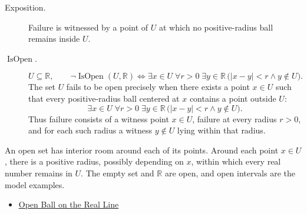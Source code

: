 \begin{remark*}
\begin{description}
  \item[Exposition.]
  Failure is witnessed by a point of $U$ at which no positive-radius ball
  remains inside $U$.

  \item[\(\operatorname{IsOpen}.\)]
  \[
  U\subseteq\mathbb{R},\qquad
  \neg\operatorname{IsOpen}(U,\mathbb{R})
  \Longleftrightarrow
  \exists x\in U\;\forall r>0\;\exists y\in\mathbb{R}\,
  \bigl(|x-y|<r\land y\notin U\bigr).
  \]
  The set $U$ fails to be open precisely when there exists a point $x\in U$
  such that every positive-radius ball centered at $x$ contains a point outside
  $U$:
\[
\exists x\in U\;\forall r>0\;\exists y\in\mathbb{R}\,
\bigl(|x-y|<r\land y\notin U\bigr).
\]
  Thus failure consists of a witness point $x\in U$, failure at every radius
  $r>0$, and for each such radius a witness $y\notin U$ lying within that
  radius.
\end{description}
\end{remark*}
\begin{remark*}[Interpretation]
An open set has interior room around each of its points. Around each point
$x\in U$, there is a positive radius, possibly depending on $x$, within which
every real number remains in $U$. The empty set and $\mathbb{R}$ are open, and
open intervals are the model examples.
\end{remark*}
\begin{dependencies}
\begin{itemize}
  \item \hyperref[def:open-ball]{Open Ball on the Real Line}
\end{itemize}
\end{dependencies}
